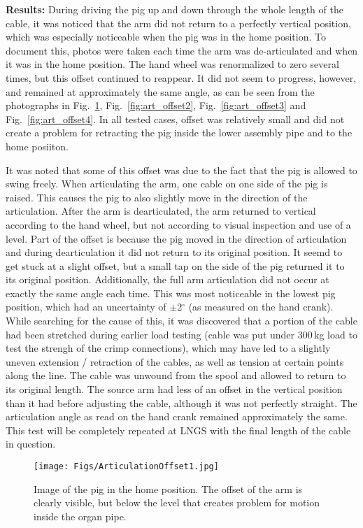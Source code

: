 \begin{itemize}
{\bf Results:} During driving the pig up and down through the whole length of the cable, it was noticed that the arm did not return to a perfectly vertical position, which was especially noticeable when the pig was in the home position. To document this, photos were taken each time the arm was de-articulated and when it was in the home position. The hand wheel was renormalized to zero several times, but this offset continued to reappear. It did not seem to progress, however, and remained at approximately the same angle, as can be seen from the photographs in Fig.~\ref{fig:art_offset1}, Fig.~\ref{fig:art_offset2}, Fig.~\ref{fig:art_offset3} and Fig.~\ref{fig:art_offset4}. In all tested cases, offset was relatively small and did not create a problem for retracting the pig inside the lower assembly pipe and to the home posiiton. 

 It was noted that some of this offset was due to the fact that the pig is allowed to swing freely. When articulating the arm, one cable on one side of the pig is raised. This causes the pig to also slightly move in the direction of the articulation. After the
arm is dearticulated, the arm returned to vertical according to the hand wheel, but not according to visual
inspection and use of a level. Part of the offset is because the pig moved in the direction of articulation and
during dearticulation it did not return to its original position. It seemd to get stuck at a slight offset, but a
small tap on the side of the pig returned it to its original position. Additionally, the full arm articulation did
not occur at exactly the same angle each time. This was most noticeable in the lowest pig position, which
had an uncertainty of $\pm$2$^{\circ}$ (as measured on the hand crank). While searching for the cause of
this, it was discovered that a portion of the cable had been stretched during earlier load testing (cable was put under 300\,kg load to test the strengh of the crimp connections), which may have
led to a slightly uneven extension / retraction of the cables, as well as tension at certain points along the
line. The cable was unwound from the spool and allowed to return to its original length.
 The source arm had less of an offset in the vertical position than it had before adjusting the cable, although it was not perfectly straight. The articulation angle as read on the hand crank remained approximately the
same. This test will be completely repeated at LNGS with the final length of the cable in question.

\begin{figure}[htbp]
 \centering
 \texttt{[image: Figs/ArticulationOffset1.jpg]}
 \caption{Image of the pig in the home position. The offset of the arm is clearly visible, but below the level that creates problem for motion inside the organ pipe.}
 \label{fig:art_offset1}
\end{figure}


\end{itemize}

